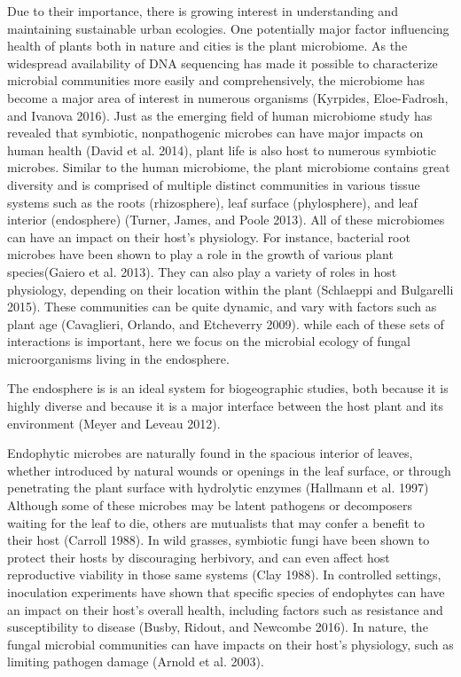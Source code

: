 \documentclass[fleqn,10pt,lineno]{wlpeerj} %
\begin{document}
Due to their importance, there is growing interest in understanding and maintaining sustainable urban ecologies. One potentially major factor influencing health of plants both in nature and cities is the plant microbiome. As the widespread availability of DNA sequencing has made it possible to characterize microbial communities more easily and comprehensively, the microbiome has become a major area of interest in numerous organisms (Kyrpides, Eloe-Fadrosh, and Ivanova 2016). Just as the emerging field of human microbiome study has revealed that symbiotic, nonpathogenic microbes can have major impacts on human health (David et al. 2014), plant life is also host to numerous symbiotic microbes. Similar to the human microbiome, the plant microbiome contains great diversity and is comprised of multiple distinct communities in various tissue systems such as the roots (rhizosphere), leaf surface (phylosphere), and leaf interior (endosphere) (Turner, James, and Poole 2013). All of these microbiomes can have an impact on their host's physiology. For instance, bacterial root microbes have been shown to play a role in the growth of various plant species(Gaiero et al. 2013). They can also play a variety of roles in host physiology, depending on their location within the plant (Schlaeppi and Bulgarelli 2015). These communities can be quite dynamic, and vary with factors such as plant age (Cavaglieri, Orlando, and Etcheverry 2009). while each of these sets of interactions is important, here we focus on the microbial ecology of fungal microorganisms living in the endosphere.

The endosphere is is an ideal system for biogeographic studies, both because it is highly diverse and because it is a major interface between the host plant and its environment (Meyer and Leveau 2012).

Endophytic microbes are naturally found in the spacious interior of leaves, whether introduced by natural wounds or openings in the leaf surface, or through penetrating the plant surface with hydrolytic enzymes (Hallmann et al. 1997) Although some of these microbes may be latent pathogens or decomposers waiting for the leaf to die, others are mutualists that may confer a benefit to their host (Carroll 1988). In wild grasses, symbiotic fungi have been shown to protect their hosts by discouraging herbivory, and can even affect host reproductive viability in those same systems (Clay 1988). In controlled settings, inoculation experiments have shown that specific species of endophytes can have an impact on their host's overall health, including factors such as resistance and susceptibility to disease (Busby, Ridout, and Newcombe 2016). In nature, the fungal microbial communities can have impacts on their host's physiology, such as limiting pathogen damage (Arnold et al. 2003).
\end{document}

